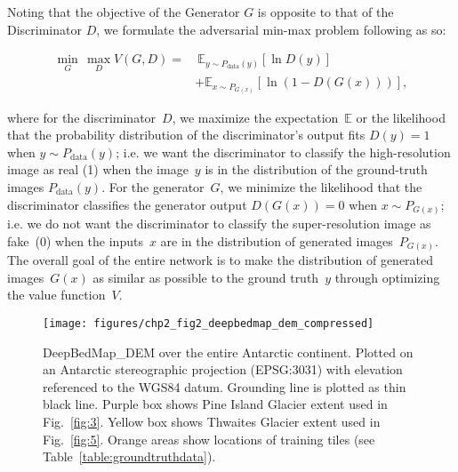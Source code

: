 Noting that the objective of the Generator $G$ is opposite to that of the Discriminator $D$, we formulate the adversarial min-max problem following \citet{GoodfellowGenerativeAdversarialNetworks2014} as so:

\begin{equation}\label{eq:4}
  \begin{split}
  \min_{G}\,\max_{D} V(G,D) =&~\mathbb{E}_{y \sim P_{\text{data}}(y)}[\ln D(y)]\\
  &+ \mathbb{E}_{x \sim P_{G(x)}}[\ln(1-D(G(x)))],
  \end{split}
\end{equation}

where for the discriminator~$D$, we maximize the expectation~$\mathbb{E}$ or the likelihood that the probability distribution of the discriminator's output fits $D(y)=1$ when $y \sim P_{\text{data}}(y)$; i.e. we want the discriminator to classify the high-resolution image as real (1) when the image~$y$ is in the distribution of the ground-truth images $P_{\text{data}}(y)$.
For the generator~$G$, we minimize the likelihood that the discriminator classifies the generator output $D(G(x))=0$ when $x \sim P_{G(x)}$; i.e. we do not want the discriminator to classify the super-resolution image as fake~(0) when the inputs~$x$ are in the distribution of generated images~$P_{G(x)}$.
The overall goal of the entire network is to make the distribution of generated images~$G(x)$ as similar as possible to the ground truth~$y$ through optimizing the value function~$V$.

\begin{figure*}[t]
    \texttt{[image: figures/chp2\_fig2\_deepbedmap\_dem\_compressed]}
    \caption[DeepBedMap\_DEM overview map over the entire Antarctic continent]{
      DeepBedMap\_DEM over the entire Antarctic continent.
      Plotted on an Antarctic stereographic projection (EPSG:3031) with elevation referenced to the WGS84 datum.
      Grounding line is plotted as thin black line.
      Purple box shows Pine Island Glacier extent used in Fig.~\ref{fig:3}.
      Yellow box shows Thwaites Glacier extent used in Fig.~\ref{fig:5}.
      Orange areas show locations of training tiles (see Table~\ref{table:groundtruthdata}).
    }
    \label{fig:2}
\end{figure*}

